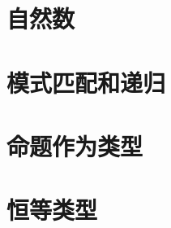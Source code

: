 \section{自然数}
\label{sec:inductive-types}


\section{模式匹配和递归}
\label{sec:pattern-matching}


\section{命题作为类型}
\label{sec:pat}


\section{恒等类型}
\label{sec:identity-types}




